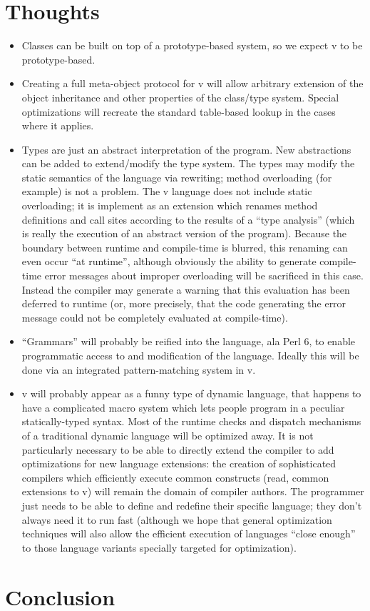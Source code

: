 \documentclass[11pt,notitlepage,twocolumn]{article}
\newcommand{\vlang}{\textsf{v}\xspace}
\begin{document}
\section{Thoughts}
\begin{itemize}
\item Classes can be built on top of a prototype-based system, so we
  expect \vlang to be prototype-based.
\item Creating a full meta-object protocol for \vlang will allow arbitrary
  extension of the object inheritance and other properties of the
  class/type system.  Special optimizations will recreate the standard
  table-based lookup in the cases where it applies.
\item Types are just an abstract interpretation of the program.  New
  abstractions can be added to extend/modify the type system.  The
  types may modify the static semantics of the language via rewriting;
  method overloading (for example) is not a problem.  The \vlang language
  does not include static overloading; it is implement as an extension which
  renames method definitions and call sites according to the results
  of a ``type analysis'' (which is really the execution of an abstract
  version of the program).  Because the boundary between runtime and
  compile-time is blurred, this renaming can even occur ``at
  runtime'', although obviously the ability to generate compile-time
  error messages about improper overloading will be sacrificed in this
  case.  Instead the compiler may generate a warning that this
  evaluation has been deferred to runtime (or, more precisely, that
  the code generating the error message could not be completely
  evaluated at compile-time).
\item ``Grammars'' will probably be reified into the language, ala
  Perl 6, to enable programmatic access to and modification of the
  language.  Ideally this will be done via an integrated
  pattern-matching system in \vlang.
\item \vlang will probably appear as a funny type of dynamic language,
  that happens to have a complicated macro system which lets people
  program in a peculiar statically-typed syntax.  Most of the
  runtime checks and dispatch mechanisms of a traditional dynamic
  language will be optimized away.  It is not particularly
  necessary to be able to directly extend the compiler to add
  optimizations for new language extensions: the creation of
  sophisticated compilers which efficiently execute common constructs
  (read, common extensions to \vlang) will remain the domain of compiler
  authors.   The programmer just needs to be able to define and
  redefine their specific language; they don't always need it to run
  fast (although we hope that general optimization techniques will
  also allow the efficient execution of languages ``close enough'' to
  those language variants specially targeted for optimization).
\end{itemize}

\section{Conclusion}


\end{document}
